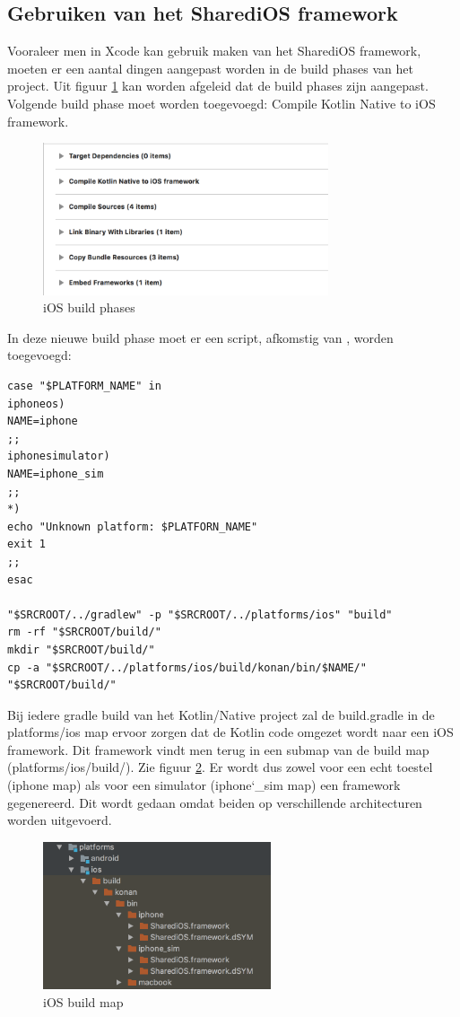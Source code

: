 \subsection{Gebruiken van het SharediOS framework}
Vooraleer men in Xcode kan gebruik maken van het SharediOS framework, moeten er een aantal dingen aangepast worden in de build phases van het project. Uit figuur \ref{fig:stap6-phases} kan worden afgeleid dat de build phases zijn aangepast. Volgende build phase moet worden toegevoegd: Compile Kotlin Native to iOS framework.
\begin{figure} [ht]
	\centering
	\includegraphics[width=0.75\textwidth]{img/stap6-phases.png}
	\caption{iOS build phases}
	\label{fig:stap6-phases}
\end{figure}

In deze nieuwe build phase moet er een script, afkomstig van \textcite{AlbertGao}, worden toegevoegd: 
\begin{lstlisting}
case "$PLATFORM_NAME" in
iphoneos)
NAME=iphone
;;
iphonesimulator)
NAME=iphone_sim
;;
*)
echo "Unknown platform: $PLATFORN_NAME"
exit 1
;;
esac

"$SRCROOT/../gradlew" -p "$SRCROOT/../platforms/ios" "build"
rm -rf "$SRCROOT/build/"
mkdir "$SRCROOT/build/"
cp -a "$SRCROOT/../platforms/ios/build/konan/bin/$NAME/" "$SRCROOT/build/"
\end{lstlisting}

Bij iedere gradle build van het Kotlin/Native project zal de build.gradle in de platforms/ios map ervoor zorgen dat de Kotlin code omgezet wordt naar een iOS framework. Dit framework vindt men terug in een submap van de build map (platforms/ios/build/). Zie figuur \ref{fig:stap6-build}. Er wordt dus zowel voor een echt toestel (iphone map) als voor een simulator (iphone\char`_sim map) een framework gegenereerd. Dit wordt gedaan omdat beiden op verschillende architecturen worden uitgevoerd.

\begin{figure} [ht]
	\centering
	\includegraphics[width=0.60\textwidth]{img/stap6-build.png}
	\caption{iOS build map}
	\label{fig:stap6-build}
\end{figure}

